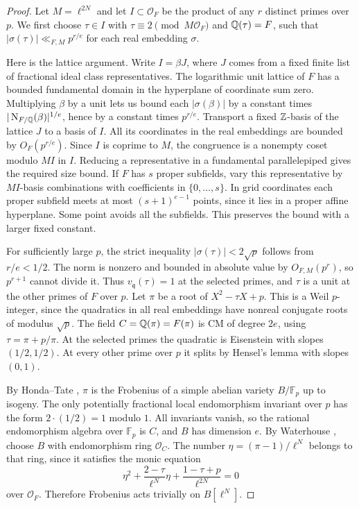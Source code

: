 \begin{proof}
Let \(M=\ell^{2N}\) and let \(I\subset\mathcal O_F\) be the product
of any \(r\) distinct primes over \(p\). We first choose
\(\tau\in I\) with \(\tau\equiv 2\pmod{M\mathcal O_F}\) and
\(\mathbb Q(\tau)=F\), such that \(|\sigma(\tau)|\ll_{F,M}p^{r/e}\)
for each real embedding \(\sigma\).

Here is the lattice argument. Write \(I=\beta J\), where \(J\) comes
from a fixed finite list of fractional ideal class representatives.
The logarithmic unit lattice of \(F\) has a bounded fundamental
domain in the hyperplane of coordinate sum zero. Multiplying
\(\beta\) by a unit lets us bound each \(|\sigma(\beta)|\) by
a constant times \(|\operatorname{N}_{F/\mathbb Q}(\beta)|^{1/e}\), hence by a constant
times \(p^{r/e}\). Transport a fixed \(\mathbb Z\)-basis of the lattice
\(J\) to a basis of \(I\). All its coordinates in the real embeddings
are bounded by \(O_F(p^{r/e})\). Since \(I\) is coprime to \(M\), the
congruence is a nonempty coset modulo \(MI\) in \(I\). Reducing a
representative in a fundamental parallelepiped gives the required
size bound. If \(F\) has \(s\) proper subfields, vary this
representative by \(MI\)-basis combinations with coefficients in
\(\{0,\ldots,s\}\). In grid coordinates each proper subfield
meets at most \((s+1)^{e-1}\) points, since it lies in a
proper affine hyperplane. Some point avoids all the subfields.
This preserves the bound with a larger fixed constant.

For sufficiently large \(p\), the strict inequality
\(|\sigma(\tau)|<2\sqrt p\) follows from \(r/e<1/2\).
The norm is nonzero and bounded in absolute value by
\(O_{F,M}(p^r)\), so \(p^{r+1}\) cannot divide it. Thus
\(v_{\mathfrak q}(\tau)=1\) at the selected primes, and
\(\tau\) is a unit at the other primes of \(F\) over \(p\).
Let \(\pi\) be a root of \(X^2-\tau X+p\). This is a Weil
\(p\)-integer, since the quadratics in all real embeddings
have nonreal conjugate roots of modulus \(\sqrt p\).
The field \(C=\mathbb Q(\pi)=F(\pi)\) is CM of degree \(2e\),
using \(\tau=\pi+p/\pi\). At the selected primes the
quadratic is Eisenstein with slopes \((1/2,1/2)\).
At every other prime over \(p\) it splits by Hensel's lemma
with slopes \((0,1)\).

By Honda--Tate \cite[Theorem~1]{tate}, \(\pi\) is the Frobenius
of a simple abelian variety \(B/\mathbb F_p\) up to isogeny.
The only potentially fractional local endomorphism invariant
over \(p\) has the form \(2\cdot(1/2)=1\) modulo \(1\).
All invariants vanish, so the rational endomorphism algebra over
\(\mathbb F_p\) is \(C\), and \(B\) has dimension \(e\).
By Waterhouse \cite[Theorem~6.1]{waterhouse}, choose \(B\) with
endomorphism ring \(\mathcal O_C\).
The number \(\eta=(\pi-1)/\ell^N\) belongs to that ring, since
it satisfies the monic equation
\[
 \eta^2+\frac{2-\tau}{\ell^N}\eta
       +\frac{1-\tau+p}{\ell^{2N}}=0
\]
over \(\mathcal O_F\). Therefore Frobenius acts trivially on
\(B[\ell^N]\).


\end{proof}
